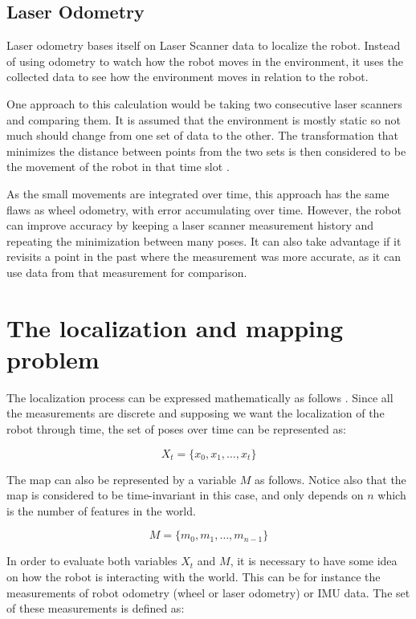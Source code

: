\subsection{Laser Odometry}

Laser odometry bases itself on Laser Scanner data to localize the robot. Instead of using odometry to watch how the robot moves in the environment, it uses the collected data to see how the environment moves in relation to the robot.

One approach to this calculation would be taking two consecutive laser scanners and comparing them. It is assumed that the environment is mostly static so not much should change from one set of data to the other. The transformation that minimizes the distance between points from the two sets is then considered to be the movement of the robot in that time slot \cite{Jaimez_et_al_ICRA2016}.

As the small movements are integrated over time, this approach has the same flaws as wheel odometry, with error accumulating over time. However, the robot can improve accuracy by keeping a laser scanner measurement history and repeating the minimization between many poses. It can also take advantage if it revisits a point in the past where the measurement was more accurate, as it can use data from that measurement for comparison.

\section{The localization and mapping problem}

The localization process can be expressed mathematically as follows \cite{thrun2005probabilistic}. Since all the measurements are discrete and supposing we want the localization of the robot through time, the set of poses over time can be represented as:

\begin{equation}\label{eq:x}
    X_t = \{x_0, x_1, \dots, x_t\} 
\end{equation}

The map can also be represented by a variable $M$ as follows. Notice also that the map is considered to be time-invariant in this case, and only depends on $n$ which is the number of features in the world.

\begin{equation}
    M = \{m_0, m_1, \dots, m_{n - 1}\}
\end{equation}

In order to evaluate both variables $X_t$ and $M$, it is necessary to have some idea on how the robot is interacting with the world. This can be for instance the measurements of robot odometry (wheel or laser odometry) or IMU data. The set of these measurements is defined as:

